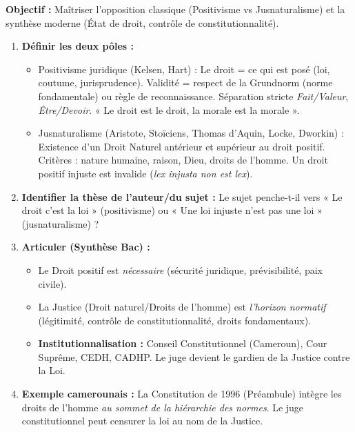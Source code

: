 \documentclass[11pt]{article}
\newcommand{\cle}[1]{{\popxbold\color{popdark}#1}}
\begin{document}
\begin{methode}
    \textbf{Objectif :} Maîtriser l'opposition classique (Positivisme vs Jusnaturalisme) et la synthèse moderne (État de droit, contrôle de constitutionnalité).
    \begin{enumerate}
        \item \textbf{Définir les deux pôles :}
            \begin{itemize}
                \item \cle{Positivisme juridique (Kelsen, Hart)} : Le droit = ce qui est posé (loi, coutume, jurisprudence). Validité = respect de la \cle{Grundnorm} (norme fondamentale) ou règle de reconnaissance. Séparation stricte \emph{Fait/Valeur}, \emph{Être/Devoir}. « Le droit est le droit, la morale est la morale ».
                \item \cle{Jusnaturalisme (Aristote, Stoïciens, Thomas d'Aquin, Locke, Dworkin)} : Existence d'un \cle{Droit Naturel} antérieur et supérieur au droit positif. Critères : nature humaine, raison, Dieu, droits de l'homme. Un droit positif injuste est invalide (\emph{lex injusta non est lex}).
            \end{itemize}
        \item \textbf{Identifier la thèse de l'auteur/du sujet :} Le sujet penche-t-il vers « Le droit c'est la loi » (positivisme) ou « Une loi injuste n'est pas une loi » (jusnaturalisme) ?
        \item \textbf{Articuler (Synthèse Bac) :} 
            \begin{itemize}
                \item Le Droit positif est \emph{nécessaire} (sécurité juridique, prévisibilité, paix civile).
                \item La Justice (Droit naturel/Droits de l'homme) est \emph{l'horizon normatif} (légitimité, contrôle de constitutionnalité, droits fondamentaux).
                \item \textbf{Institutionnalisation :} Conseil Constitutionnel (Cameroun), Cour Suprême, CEDH, CADHP. Le juge devient le gardien de la Justice contre la Loi.
            \end{itemize}
        \item \textbf{Exemple camerounais :} La Constitution de 1996 (Préambule) intègre les droits de l'homme \emph{au sommet de la hiérarchie des normes}. Le juge constitutionnel peut censurer la loi au nom de la Justice.
    \end{enumerate}
\end{methode}
\end{document}
